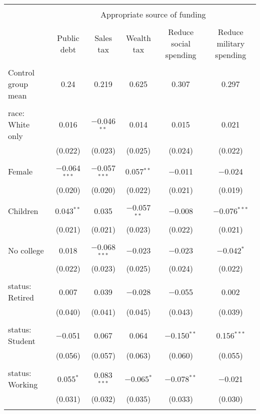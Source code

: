 
\begin{tabular}{@{\extracolsep{5pt}}lccccc} 
\\[-1.8ex]\hline 
\hline \\[-1.8ex] 
 & \multicolumn{5}{c}{Appropriate source of funding} \\ 
\cline{2-6} 
\\[-1.8ex] & Public debt & Sales tax & Wealth tax & Reduce social spending & Reduce military spending \\ 
\hline \\[-1.8ex] 
 Control group mean & 0.24 & 0.219 & 0.625 & 0.307 & 0.297  \\ \hline \\[-1.8ex] race: White only & 0.016 & $-$0.046$^{**}$ & 0.014 & 0.015 & 0.021 \\ 
  & (0.022) & (0.023) & (0.025) & (0.024) & (0.022) \\ 
  & & & & & \\ 
 Female & $-$0.064$^{***}$ & $-$0.057$^{***}$ & 0.057$^{**}$ & $-$0.011 & $-$0.024 \\ 
  & (0.020) & (0.020) & (0.022) & (0.021) & (0.019) \\ 
  & & & & & \\ 
 Children & 0.043$^{**}$ & 0.035 & $-$0.057$^{**}$ & $-$0.008 & $-$0.076$^{***}$ \\ 
  & (0.021) & (0.021) & (0.023) & (0.022) & (0.021) \\ 
  & & & & & \\ 
 No college & 0.018 & $-$0.068$^{***}$ & $-$0.023 & $-$0.023 & $-$0.042$^{*}$ \\ 
  & (0.022) & (0.023) & (0.025) & (0.024) & (0.022) \\ 
  & & & & & \\ 
 status: Retired & 0.007 & 0.039 & $-$0.028 & $-$0.055 & 0.002 \\ 
  & (0.040) & (0.041) & (0.045) & (0.043) & (0.039) \\ 
  & & & & & \\ 
 status: Student & $-$0.051 & 0.067 & 0.064 & $-$0.150$^{**}$ & 0.156$^{***}$ \\ 
  & (0.056) & (0.057) & (0.063) & (0.060) & (0.055) \\ 
  & & & & & \\ 
 status: Working & 0.055$^{*}$ & 0.083$^{***}$ & $-$0.065$^{*}$ & $-$0.078$^{**}$ & $-$0.021 \\ 
  & (0.031) & (0.032) & (0.035) & (0.033) & (0.030) \\ 
  & & & & & \\ 

\end{tabular}
